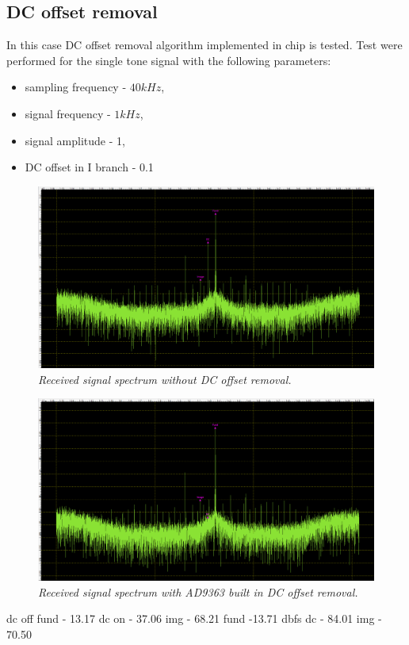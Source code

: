 \documentclass[en,printmode]{mgr}
\begin{document}
		\subsection*{DC offset removal}
			In this case DC offset removal algorithm implemented in chip is tested.
			Test were performed for the single tone signal with the following parameters:
			\begin{itemize}
				\item sampling frequency - $40kHz$,
				\item signal frequency - $1kHz$,
				\item signal amplitude - 1,
				\item DC offset in I branch - 0.1
			\end{itemize}
			\newpage
   		 	\begin{figure}[!htb]
    			\centering
   				\includegraphics[width=\textwidth]{plots/real_dcoff.png}
   		 		\caption{\textit{Received signal spectrum without DC offset removal.}}
   		 	\end{figure}
   		 	\begin{figure}[!htb]
    			\centering
   				\includegraphics[width=\textwidth]{plots/real_dcon.png}
   		 		\caption{\textit{Received signal spectrum with AD9363 built in DC offset removal.}}
   		 	\end{figure}
			dc off   		 	
   		 	fund - 13.17
   		 	dc on - 37.06
   		 	img - 68.21
   		 	fund -13.71 dbfs
   		 	dc - 84.01
   		 	img - 70.50
   		\newpage
\end{document}
